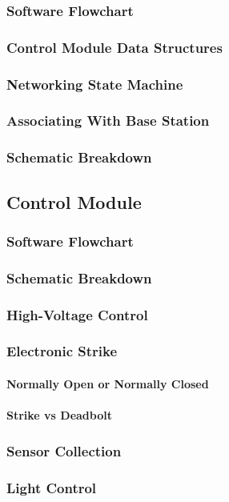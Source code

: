\subsubsection{Software Flowchart}

\subsubsection{Control Module Data Structures}

\subsubsection{Networking State Machine}

\subsubsection{Associating With Base Station}

\subsubsection{Schematic Breakdown}

\subsection{Control Module}

\subsubsection{Software Flowchart}

\subsubsection{Schematic Breakdown}

\subsubsection{High-Voltage Control}

\subsubsection{Electronic Strike}
\label{sec:electronic-strike}

\paragraph{Normally Open or Normally Closed}

\paragraph{Strike vs Deadbolt}

\subsubsection{Sensor Collection}

\subsubsection{Light Control}

